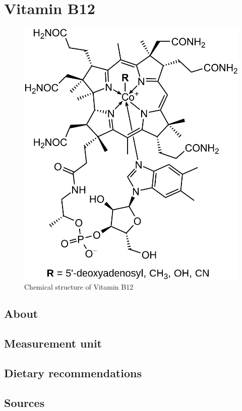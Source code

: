 \documentclass{book}
\begin{document}
\chapter{Vitamin B12}
\begin{figure}[h]
	\centering \includegraphics[width=0.75\linewidth]{images/Vitamin_B12_chemical_structure}
	\caption{Chemical structure of Vitamin B12}
\end{figure}

\section{About}


\section{Measurement unit}


\section{Dietary recommendations}


\section{Sources}
\end{document}
